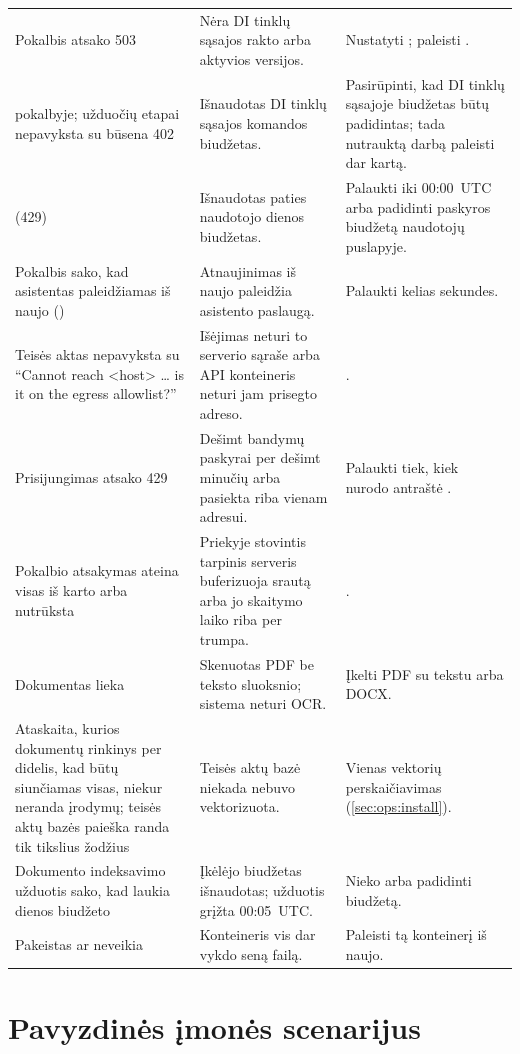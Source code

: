 \begin{xltabular}{\textwidth}{@{}L{43mm}YL{42mm}@{}}
Pokalbis atsako 503 & Nėra DI tinklų sąsajos rakto arba aktyvios  versijos. & Nustatyti ; paleisti . \\
 pokalbyje; užduočių etapai nepavyksta su būsena 402 & Išnaudotas DI tinklų sąsajos komandos biudžetas. & Pasirūpinti, kad DI tinklų sąsajoje biudžetas būtų padidintas; tada nutrauktą darbą paleisti dar kartą. \\
 (429) & Išnaudotas paties naudotojo dienos biudžetas. & Palaukti iki 00:00~UTC arba padidinti paskyros biudžetą naudotojų puslapyje. \\
Pokalbis sako, kad asistentas paleidžiamas iš naujo () & Atnaujinimas iš naujo paleidžia asistento paslaugą. & Palaukti kelias sekundes. \\
Teisės aktas nepavyksta su \enquote{Cannot reach <host> … is it on the egress allowlist?} & Išėjimas neturi to serverio sąraše arba API konteineris neturi jam prisegto adreso. & . \\
Prisijungimas atsako 429  & Dešimt bandymų paskyrai per dešimt minučių arba pasiekta riba vienam adresui. & Palaukti tiek, kiek nurodo antraštė . \\
Pokalbio atsakymas ateina visas iš karto arba nutrūksta & Priekyje stovintis tarpinis serveris buferizuoja srautą arba jo skaitymo laiko riba per trumpa. & . \\
Dokumentas lieka  & Skenuotas PDF be teksto sluoksnio; sistema neturi OCR. & Įkelti PDF su tekstu arba DOCX. \\
Ataskaita, kurios dokumentų rinkinys per didelis, kad būtų siunčiamas visas, niekur neranda įrodymų; teisės aktų bazės paieška randa tik tikslius žodžius & Teisės aktų bazė niekada nebuvo vektorizuota. & Vienas vektorių perskaičiavimas (\cref{sec:ops:install}). \\
Dokumento indeksavimo užduotis sako, kad laukia dienos biudžeto & Įkėlėjo biudžetas išnaudotas; užduotis grįžta 00:05~UTC. & Nieko arba padidinti biudžetą. \\
Pakeistas  ar  neveikia & Konteineris vis dar vykdo seną failą. & Paleisti tą konteinerį iš naujo. \\
\end{xltabular}


\section{Pavyzdinės įmonės scenarijus}\label{sec:ops:demo}

